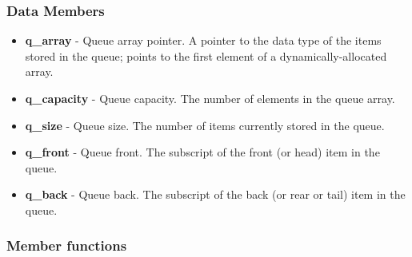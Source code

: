 \documentclass{report}
\begin{document}
     \subsubsection{Data Members}
     \begin{itemize}
        \item \textbf{q\_array} - Queue array pointer. A pointer to the data type of the items stored in the queue; points to the first element of a dynamically-allocated array.
        \item \textbf{q\_capacity} - Queue capacity. The number of elements in the queue array.
        \item \textbf{q\_size} - Queue size. The number of items currently stored in the queue.
        \item \textbf{q\_front} - Queue front. The subscript of the front (or head) item in the queue.
        \item \textbf{q\_back} - Queue back. The subscript of the back (or rear or tail) item in the queue.
    \end{itemize}
     \bigbreak \noindent 
     \subsubsection{Member functions}
\end{document}
